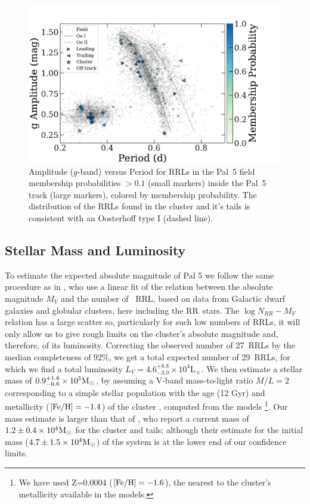 \documentclass[twocolumn]{aastex63}
\begin{document}
\begin{figure}[t]
\begin{center}
\includegraphics[width=\textwidth]{rrls_PA.pdf}
\caption{Amplitude ($g$-band) versus Period for RRLs in the Pal~5 field membership probabilities $>0.1$ (small markers) inside the Pal~5 track (large markers), colored by membership probability. The distribution of the RRLs found in the cluster and it's tails is consistent with an Oosterhoff type I (dashed line). }
\label{fig:PA_diagram}
\end{center}
\end{figure}

\subsection{Stellar Mass and Luminosity}

To estimate the expected absolute magnitude of Pal 5 we follow the same procedure as in \citet{Mateu:2018}, who use a linear fit of the relation between the absolute magnitude $M_V$ and the number of \typeab\ RRL, based on data from Galactic dwarf galaxies and globular clusters, here including the RR\typec~stars.  The $\log{N_{RR}}-M_V$ relation has a large scatter so, particularly for such low numbers of RRLs, it will only allow us to give rough limits on the cluster's absolute magnitude and, therefore, of its luminosity. Correcting the observed number of 27~RRLs by the median completeness of 92\%, we get a total expected number of 29~RRLs, for which we find a total luminosity $L_V=4.6_{-3.0}^{+8.8}\times 10^4 \mathrm{L}_\sun$.
We then estimate a stellar mass of $0.9_{-0.6}^{+1.8}\times 10^5 \mathrm{M}_\odot$, by assuming a V-band mass-to-light ratio $M/L=2$ corresponding to a simple stellar population with the age (12 Gyr) and metallicity ($[\mathrm{Fe}/\mathrm{H}]=-1.4$) of the cluster \citep{Dotter:2011}, computed from the \citet{Bruzual:2003} models \footnote{We have used Z=0.0004 ($[\mathrm{Fe}/\mathrm{H}]=-1.6$), the nearest to the cluster's metallicity available in the models.}. Our mass estimate is larger than that of \citet{Ibata:2017}, who report a current mass of $1.2\pm 0.4 \times10^4\mathrm{M}_\odot$ for the cluster and tails; although their estimate for the initial mass ($4.7\pm 1.5\times10^4\mathrm{M}_\odot$) of the system is at the lower end of our confidence limits.
\end{document}
